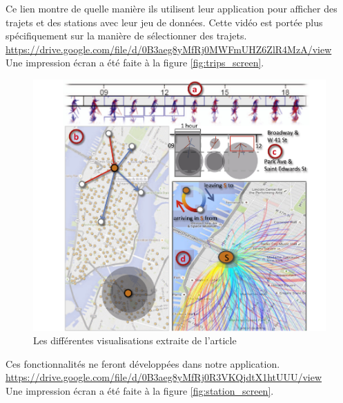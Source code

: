 \documentclass[12pt]{article}
\begin{document}
	Ce lien montre de quelle manière ils utilisent leur application pour afficher des trajets et
	des stations avec leur jeu de données. Cette vidéo est portée plus spécifiquement sur la manière
	de sélectionner des trajets.\\
	\url{https://drive.google.com/file/d/0B3aeg8yMfRj0MWFmUHZ6ZlR4MzA/view}\\
	Une impression écran a été faite à la figure \ref{fig:trips_screen}.\\

	\begin{figure}[!h]
	\begin{center}
	\includegraphics[scale=.3]{screenshot_article.png}
	\caption{Les différentes visualisations extraite de l'article \cite{Oli16}}
	\end{center}
	\end{figure}
	
	Ces fonctionnalités ne feront développées dans notre application.\\
	\url{https://drive.google.com/file/d/0B3aeg8yMfRj0R3VKQjdtX1htUUU/view}\\
	Une impression écran a été faite à la figure \ref{fig:station_screen}.\\
	
\end{document}
